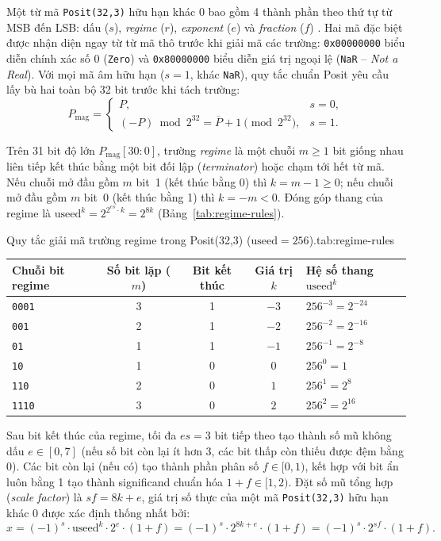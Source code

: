 Một từ mã \texttt{Posit(32,3)} hữu hạn khác 0 bao gồm 4 thành phần theo thứ tự từ MSB đến LSB: dấu ($s$), \textit{regime} ($r$), \textit{exponent} ($e$) và \textit{fraction} ($f$) \cite{gustafson2017posit,positstandard2022}. Hai mã đặc biệt được nhận diện ngay từ từ mã thô trước khi giải mã các trường: \texttt{0x00000000} biểu diễn chính xác số $0$ (\texttt{Zero}) và \texttt{0x80000000} biểu diễn giá trị ngoại lệ (\texttt{NaR} -- \textit{Not a Real}). Với mọi mã âm hữu hạn ($s=1$, khác \texttt{NaR}), quy tắc chuẩn Posit yêu cầu lấy bù hai toàn bộ 32 bit trước khi tách trường:
\[
P_{\mathrm{mag}} = \begin{cases} P, & s = 0, \\ (-P) \bmod 2^{32} = \overline{P} + 1 \pmod{2^{32}}, & s = 1. \end{cases}
\]

Trên 31 bit độ lớn $P_{\mathrm{mag}}[30:0]$, trường \textit{regime} là một chuỗi $m \ge 1$ bit giống nhau liên tiếp kết thúc bằng một bit đối lập (\textit{terminator}) hoặc chạm tới hết từ mã. Nếu chuỗi mở đầu gồm $m$ bit~1 (kết thúc bằng 0) thì $k = m - 1 \ge 0$; nếu chuỗi mở đầu gồm $m$ bit~0 (kết thúc bằng 1) thì $k = -m < 0$. Đóng góp thang của regime là $\mathrm{useed}^k = 2^{2^{es}\cdot k} = 2^{8k}$ (Bảng~\ref{tab:regime-rules}).

\begin{engineeringtable}{Quy tắc giải mã trường regime trong Posit(32,3) ($\mathrm{useed}=256$).}{tab:regime-rules}
\begin{tabularx}{\linewidth}{@{}lccc Y@{}}
\toprule
Chuỗi bit regime & Số bit lặp ($m$) & Bit kết thúc & Giá trị $k$ & Hệ số thang $\mathrm{useed}^k$ \\
\midrule
\texttt{0001} & 3 & 1 & $-3$ & $256^{-3} = 2^{-24}$ \\
\texttt{001} & 2 & 1 & $-2$ & $256^{-2} = 2^{-16}$ \\
\texttt{01} & 1 & 1 & $-1$ & $256^{-1} = 2^{-8}$ \\
\texttt{10} & 1 & 0 & $0$ & $256^{0} = 1$ \\
\texttt{110} & 2 & 0 & $1$ & $256^{1} = 2^{8}$ \\
\texttt{1110} & 3 & 0 & $2$ & $256^{2} = 2^{16}$ \\
\bottomrule
\end{tabularx}
\end{engineeringtable}

Sau bit kết thúc của regime, tối đa $es=3$ bit tiếp theo tạo thành số mũ không dấu $e \in [0, 7]$ (nếu số bit còn lại ít hơn 3, các bit thấp còn thiếu được đệm bằng 0). Các bit còn lại (nếu có) tạo thành phần phân số $f \in [0, 1)$, kết hợp với bit ẩn luôn bằng 1 tạo thành significand chuẩn hóa $1 + f \in [1, 2)$. Đặt số mũ tổng hợp (\textit{scale factor}) là $sf = 8k + e$, giá trị số thực của một mã \texttt{Posit(32,3)} hữu hạn khác 0 được xác định thống nhất bởi:
\[
x = (-1)^s \cdot \mathrm{useed}^k \cdot 2^e \cdot (1 + f) = (-1)^s \cdot 2^{8k+e} \cdot (1 + f) = (-1)^s \cdot 2^{sf} \cdot (1 + f).
\]

